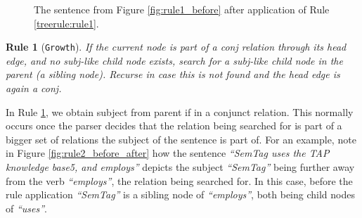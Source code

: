 \documentclass[11pt,a4paper,openright]{memoir}
\newtheorem{treerule}{Rule}
\begin{document}
\begin{figure}[!htbp]
\centering


\caption[The sentence from Figure \ref{fig:rule_before} after application of Rule \ref{treerule:rule1}.]{The sentence from Figure \ref{fig:rule1_before} after application of Rule \ref{treerule:rule1}.}
\label{fig:rule1_after}
\end{figure}

\begin{treerule}[\texttt{Growth}]
\label{treerule:rule2}
If the current node is part of a \emph{conj} relation through its head edge, and no \emph{subj}-like child node exists, search for a \emph{subj}-like child node in the parent (a sibling node). Recurse in case this is not found and the head edge is again a \emph{conj}.
\end{treerule}

In Rule \ref{treerule:rule2}, we obtain subject from parent if in a conjunct relation. This normally occurs once the parser decides that the relation being searched for is part of a bigger set of relations the subject of the sentence is part of. For an example, note in Figure \ref{fig:rule2_before_after} how the sentence \emph{\enquote{SemTag uses the TAP knowledge base5, and employs}} depicts the subject \emph{\enquote{SemTag}} being further away from the verb \emph{\enquote{employs}}, the relation being searched for. In this case, before the rule application \emph{\enquote{SemTag}} is a sibling node of \emph{\enquote{employs}}, both being child nodes of \emph{\enquote{uses}}.
\end{document}
